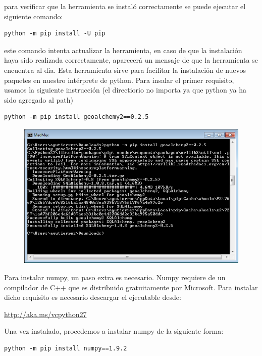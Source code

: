 \documentclass[11pt, spanish]{memoir}
\begin{document}
para verificar que la herramienta se instaló correctamente se puede ejecutar el siguiente comando:

\begin{lstlisting} 
python -m pip install -U pip
\end{lstlisting}

este comando intenta actualizar la herramienta, en caso de que la instalación haya sido realizada correctamente, aparecerá un mensaje de que la herramienta se encuentra al dia. Esta herramienta sirve para facilitar la instalación de nuevos paquetes en nuestro intérprete de python. Para insalar el primer requisito, usamos la siguiente instrucción (el directiorio no importa ya que python ya ha sido agregado al path)

\begin{lstlisting} 
python -m pip install geoalchemy2==0.2.5
\end{lstlisting}

\begin{figure}[H]
\centering
\includegraphics[width=14cm]{geoalchemy.png}
\end{figure}

Para instalar numpy, un paso extra es necesario. Numpy requiere de un compilador de C++ que es distribuido gratuitamente por Microsoft. Para instalar dicho requisito es necesario descargar el ejecutable desde:

\url{http://aka.ms/vcpython27}

Una vez instalado, procedemos a instalar numpy de la siguiente forma:

\begin{lstlisting} 
python -m pip install numpy==1.9.2
\end{lstlisting}
\end{document}
